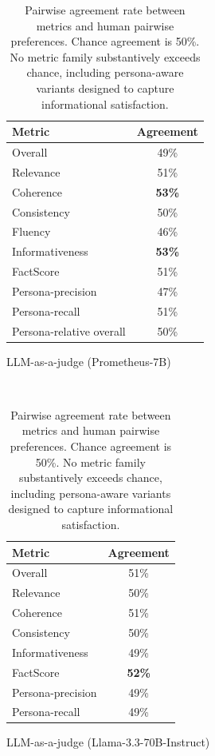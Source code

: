 \begin{table}[h!]
\begin{subtable}[t]{0.55\textwidth}
\begin{tabular}{lc}
\toprule
\textbf{Metric} & \textbf{Agreement} \\
\midrule
Overall                  & 49\% \\
Relevance                & 51\% \\
Coherence                & \textbf{53\%} \\
Consistency              & 50\% \\
Fluency                  & 46\% \\
Informativeness          & \textbf{53\%} \\
FactScore                & 51\% \\
Persona-precision        & 47\% \\
Persona-recall           & 51\% \\
Persona-relative overall & 50\% \\
\bottomrule
\end{tabular}
\caption{LLM-as-a-judge (Prometheus-7B)}
\end{subtable}
\vspace{1em} \\
\begin{subtable}[t]{0.55\textwidth}
\centering
\begin{tabular}{lc}
\toprule
\textbf{Metric} & \textbf{Agreement} \\
\midrule
Overall            & 51\% \\
Relevance          & 50\% \\
Coherence          & 51\% \\
Consistency        & 50\% \\
Informativeness    & 49\% \\
FactScore          & \textbf{52\%} \\
Persona-precision  & 49\% \\
Persona-recall     & 49\% \\
\bottomrule
\end{tabular}
\caption{LLM-as-a-judge (Llama-3.3-70B-Instruct)}
\end{subtable}
\caption[Pairwise agreement rate between metrics and human pairwise preferences.]{Pairwise agreement rate between metrics and human pairwise preferences. Chance agreement is 50\%. No metric family substantively exceeds chance, including persona-aware variants designed to capture informational satisfaction.}
\label{tab:metric-agreement}
\end{table}